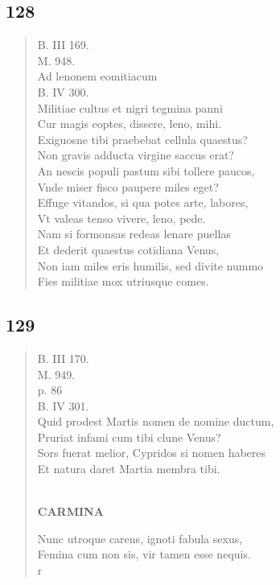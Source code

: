 \documentclass[11pt, a4paper]{report}
\begin{document}
            \subsection*{128}
      \begin{verse}
      B. III 169. \\ M. 948. \\ Ad lenonem eomitiacum \\ B. IV 300. \\ Militiae cultus et nigri tegmina panni \\ Cur magis eoptes, dissere, leno, mihi. \\ Exiguosne tibi praebebat cellula quaestus? \\ Non gravis adducta virgine saccus erat? \\ An nescis populi pastum sibi tollere paucos, \\ Vnde miser fisco paupere miles eget? \\ Effuge vitandos, si qua potes arte, labores, \\ Vt valeas tenso vivere, leno, pede. \\ Nam si formonsas redeas lenare puellas \\ Et dederit quaestus cotidiana Venus, \\ Non iam miles eris humilis, sed divite nummo \\ Fies militiae mox utriusque comes. \\ 
      \end{verse}
  
            \subsection*{129}
      \begin{verse}
      B. III 170. \\ M. 949. \\ p. 86 \\ B. IV 301. \\ Quid prodest Martis nomen de nomine ductum, \\ Pruriat infami cum tibi clune Venus? \\ Sors fuerat melior, Cypridos si nomen haberes \\ Et natura daret Martia membra tibi. \\ 
        ﻿\pagebreak 
     \marginpar{[138]} \begin{center} \textbf{CARMINA} \end{center}Nunc utroque carens, ignoti fabula sexus, \\ Femina cum non sis, vir tamen esse nequis. \\ r \\ 
      \end{verse}
  
\end{document}
